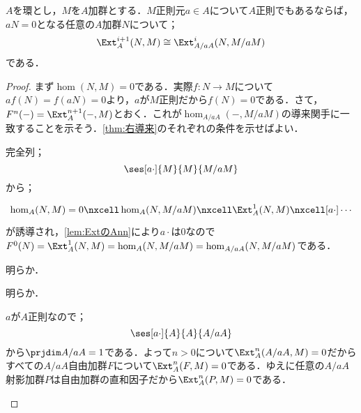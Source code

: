 \begin{lem}\label{lem:A/aAのExt}
	$A$を環とし，$M$を$A$加群とする．$M$正則元$a\in A$について$A$正則でもあるならば，$aN=0$となる任意の$A$加群$N$について；
	\[\Ext^{i+1}_A(N,M)\cong\Ext^i_{A/aA}(N,M/aM)\]
	である．
\end{lem}

\begin{proof}
	まず$\hom(N,M)=0$である．実際$f:N\to M$について$af(N)=f(aN)=0$より，$a$が$M$正則だから$f(N)=0$である．さて，$F^n(-)=\Ext^{n+1}_{A}(-,M)$とおく．これが$\hom_{A/aA}(-,M/aM)$の導来関手に一致することを示そう．\ref{thm:右導来}のそれぞれの条件を示せばよい．
	
	\begin{sakura}
		\item 
			完全列；
			\[\ses[a\cdot]{M}{M}{M/aM}\]
			から；
			\[\begin{tikzcd}
				\hom_A(N,M)=0\nxcell\hom_A(N,M/aM)\nxcell\Ext^1_A(N,M)\nxcell[a\cdot]\cdots
			\end{tikzcd}\]
			が誘導され，\ref{lem:ExtのAnn}により$a\cdot$は$0$なので$F^0(N)=\Ext^1_A(N,M)=\hom_A(N,M/aM)=\hom_{A/aA}(N,M/aM)$である．
		\item 明らか．
		\item 明らか．
		\item 
			$a$が$A$正則なので；
			\[\ses[a\cdot]{A}{A}{A/aA}\]
			から$\prjdim A/aA=1$である．よって$n>0$について$\Ext^n_A(A/aA,M)=0$だからすべての$A/aA$自由加群$F$について$\Ext^n_A(F,M)=0$である．ゆえに任意の$A/aA$射影加群$P$は自由加群の直和因子だから$\Ext^n_A(P,M)=0$である．
	\end{sakura}
\end{proof}

